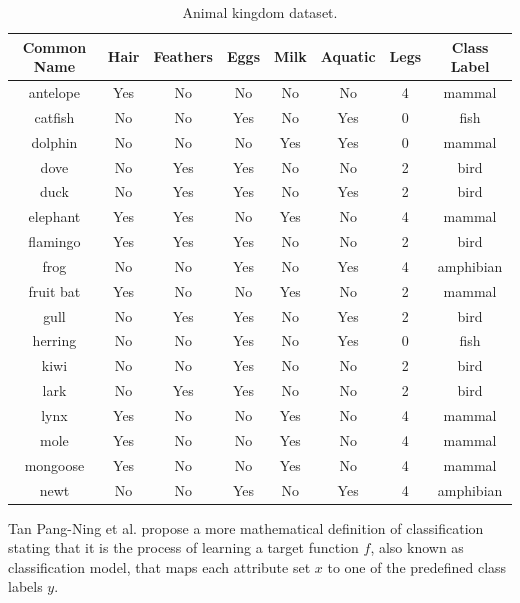 \begin{table}[!htp]
\centering
\begin{tabular}{ |c|c|c|c|c|c|c|c| }
\hline
Common Name & Hair & Feathers & Eggs & Milk & Aquatic & Legs & Class Label \\ \hline
antelope & Yes & No & No & No & No & 4 & mammal \\ \hline
catfish & No & No & Yes & No & Yes & 0 & fish \\ \hline
dolphin & No & No & No & Yes & Yes & 0 & mammal \\ \hline
dove & No & Yes & Yes & No & No & 2 & bird \\ \hline
duck & No & Yes & Yes & No & Yes & 2 & bird \\ \hline
elephant & Yes & Yes & No & Yes & No & 4 & mammal \\ \hline
flamingo & Yes & Yes & Yes & No & No & 2 & bird \\ \hline
frog & No & No & Yes & No & Yes & 4 & amphibian \\ \hline
fruit bat & Yes & No & No & Yes & No & 2 & mammal \\ \hline
gull & No & Yes & Yes & No & Yes & 2 & bird \\ \hline
herring & No & No & Yes & No & Yes & 0 & fish \\ \hline
kiwi & No & No & Yes & No & No & 2 & bird \\ \hline
lark & No & Yes & Yes & No & No & 2 & bird \\ \hline
lynx & Yes & No & No & Yes & No & 4 & mammal \\ \hline
mole & Yes & No & No & Yes & No & 4 & mammal \\ \hline
mongoose & Yes & No & No & Yes & No & 4 & mammal \\ \hline
newt & No & No & Yes & No & Yes & 4 & amphibian \\
\hline
\end{tabular}
\label{tab:clasiffication_table}
\caption{Animal kingdom dataset.}
\end{table}

Tan Pang-Ning et al. propose a more mathematical definition of classification stating that it is the process of learning a target function $f$, also known as classification model, that maps each attribute set $x$ to one of the predefined class labels $y$.

